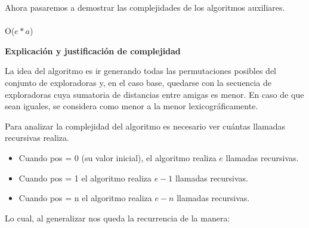 \documentclass[11pt]{article}
\begin{document}
Ahora pasaremos a demostrar las complejidades de los algoritmos auxiliares.
\\ \\
\noindent\makebox[\linewidth]{\rule{17cm}{0.4pt}}
 {O($e*a$)}

\vspace{3mm}
\begin{center}
\textbf{Explicación y justificación de complejidad} \\ 
\end{center} 

La idea del algoritmo es ir generando todas las permutaciones posibles del conjunto de exploradoras y, en el 
caso base, quedarse con la secuencia de exploradoras cuya sumatoria de distancias entre 
amigas es menor. En caso de que sean iguales, se considera como menor a la menor lexicográficamente. 

Para analizar la complejidad del algoritmo es necesario ver cuántas llamadas recursivas realiza.
\begin{itemize}
\item Cuando pos = 0 (su valor inicial), el algoritmo realiza $e$ llamadas recursivas.
\item Cuando pos = 1 el algoritmo realiza $e-1$ llamadas recursivas.
\item Cuando pos = n el algoritmo realiza $e-n$ llamadas recursivas.
\end{itemize}

Lo cual, al generalizar nos queda la recurrencia de la manera:
\end{document}
